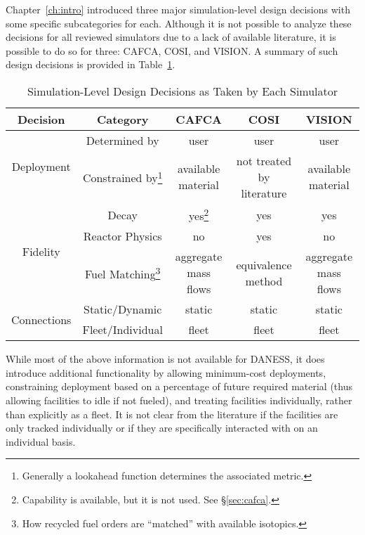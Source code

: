 Chapter~\ref{ch:intro} introduced three major simulation-level design decisions
with some specific subcategories for each. Although it is not possible to
analyze these decisions for all reviewed simulators due to a lack of available
literature, it is possible to do so for three: CAFCA, COSI, and VISION. A
summary of such design decisions is provided in Table~\ref{tab:sim-summary}.

\begin{savenotes}
\begin{table} [h!]
\centering
\begin{tabular} {|c|c|c|c|c|}
\hline
Decision                     & Category & CAFCA & COSI & VISION \\ 
\hline
\multirow{2}{*}{Deployment}  & Determined by 
                             & user & user & user \\ \cline{2-5}
                             & Constrained by\footnote{Generally a lookahead function determines the associated metric.}   
                             & available material & not treated by literature & available material \\ \hline
\multirow{3}{*}{Fidelity}    & Decay 
                             & yes\footnote{Capability is available, but it is not used. See \S\ref{sec:cafca}.} & yes & yes \\ \cline{2-5}
                             & Reactor Physics 
                             & no & yes & no \\ \cline{2-5}
                             & Fuel Matching\footnote{How recycled fuel orders are ``matched'' with available isotopics.} 
                             & aggregate mass flows & equivalence method & aggregate mass flows \\ \hline
\multirow{2}{*}{Connections} & Static/Dynamic 
                             & static & static & static \\ \cline{2-5}
                             & Fleet/Individual 
                             & fleet & fleet & fleet \\
\hline
\end{tabular}
\caption{Simulation-Level Design Decisions as Taken by Each Simulator}
\label{tab:sim-summary}
\end{table}
\end{savenotes}

While most of the above information is not available for DANESS, it does
introduce additional functionality by allowing minimum-cost deployments,
constraining deployment based on a percentage of future required material (thus
allowing facilities to idle if not fueled), and treating facilities
individually, rather than explicitly as a fleet. It is not clear from the
literature if the facilities are only tracked individually or if they are
specifically interacted with on an individual basis.
